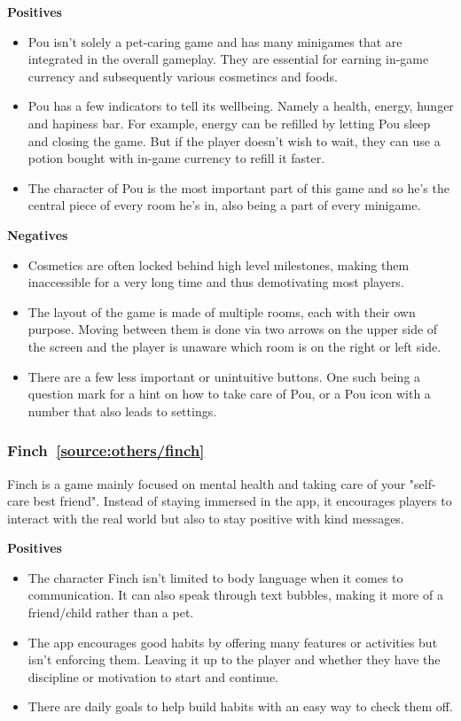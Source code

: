 \documentclass[11pt]{article}
\begin{document}
\textbf{Positives}
    \begin{itemize}
        \item Pou isn't solely a pet-caring game and has many minigames that are integrated in the overall gameplay. They are essential for earning in-game currency and subsequently various cosmetincs and foods.
        \item Pou has a few indicators to tell its wellbeing. Namely a health, energy, hunger and hapiness bar. For example, energy can be refilled by letting Pou sleep and closing the game. But if the player doesn't wish to wait, they can use a potion bought with in-game currency to refill it faster.
        \item The character of Pou is the most important part of this game and so he's the central piece of every room he's in, also being a part of every minigame.
    \end{itemize}

\textbf{Negatives}
    \begin{itemize}
        \item Cosmetics are often locked behind high level milestones, making them inaccessible for a very long time and thus demotivating most players.
        \item The layout of the game is made of multiple rooms, each with their own purpose. Moving between them is done via two arrows on the upper side of the screen and the player is unaware which room is on the right or left side.
        \item There are a few less important or unintuitive buttons. One such being a question mark for a hint on how to take care of Pou, or a Pou icon with a number that also leads to settings.
    \end{itemize}

    \subsubsection{Finch~\ref{source:others/finch}}
    Finch is a game mainly focused on mental health and taking care of your "self-care best friend". Instead of staying immersed in the app, it encourages players to interact with the real world but also to stay positive with kind messages. 

    \textbf{Positives}
    \begin{itemize}
        \item  The character Finch isn't limited to body language when it comes to communication. It can also speak through text bubbles, making it more of a friend/child rather than a pet.
        \item The app encourages good habits by offering many features or activities but isn't enforcing them. Leaving it up to the player and whether they have the discipline or motivation to start and continue.
        \item There are daily goals to help build habits with an easy way to check them off.
    \end{itemize}
\end{document}
